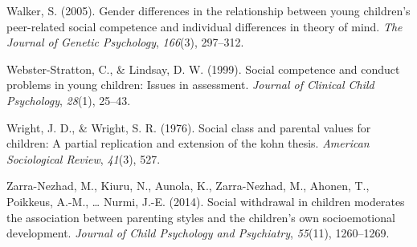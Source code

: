 \documentclass[man]{apa6}
\begin{document}
\leavevmode\hypertarget{ref-walker2005gender}{}%
Walker, S. (2005). Gender differences in the relationship between young children's peer-related social competence and individual differences in theory of mind. \emph{The Journal of Genetic Psychology}, \emph{166}(3), 297--312.

\leavevmode\hypertarget{ref-webster1999social}{}%
Webster-Stratton, C., \& Lindsay, D. W. (1999). Social competence and conduct problems in young children: Issues in assessment. \emph{Journal of Clinical Child Psychology}, \emph{28}(1), 25--43.

\leavevmode\hypertarget{ref-wright_wright_1976}{}%
Wright, J. D., \& Wright, S. R. (1976). Social class and parental values for children: A partial replication and extension of the kohn thesis. \emph{American Sociological Review}, \emph{41}(3), 527.

\leavevmode\hypertarget{ref-zarra2014social}{}%
Zarra-Nezhad, M., Kiuru, N., Aunola, K., Zarra-Nezhad, M., Ahonen, T., Poikkeus, A.-M., \ldots{} Nurmi, J.-E. (2014). Social withdrawal in children moderates the association between parenting styles and the children's own socioemotional development. \emph{Journal of Child Psychology and Psychiatry}, \emph{55}(11), 1260--1269.

\endgroup
\end{document}

